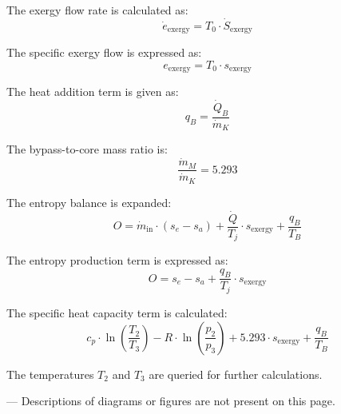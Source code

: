The exergy flow rate is calculated as:  
\[
\dot{e}_{\text{exergy}} = T_0 \cdot \dot{S}_{\text{exergy}}
\]  

The specific exergy flow is expressed as:  
\[
e_{\text{exergy}} = T_0 \cdot s_{\text{exergy}}
\]  

The heat addition term is given as:  
\[
q_B = \frac{\dot{Q}_B}{\dot{m}_K}
\]  

The bypass-to-core mass ratio is:  
\[
\frac{\dot{m}_M}{\dot{m}_K} = 5.293
\]  

The entropy balance is expanded:  
\[
O = \dot{m}_{\text{in}} \cdot (s_e - s_a) + \frac{\dot{Q}}{T_j} \cdot s_{\text{exergy}} + \frac{q_B}{T_B}
\]  

The entropy production term is expressed as:  
\[
O = s_e - s_a + \frac{q_B}{T_j} \cdot s_{\text{exergy}}
\]  

The specific heat capacity term is calculated:  
\[
c_p \cdot \ln \left( \frac{T_2}{T_3} \right) - R \cdot \ln \left( \frac{p_2}{p_3} \right) + 5.293 \cdot s_{\text{exergy}} + \frac{q_B}{T_B}
\]  

The temperatures \( T_2 \) and \( T_3 \) are queried for further calculations.  

---  
Descriptions of diagrams or figures are not present on this page.